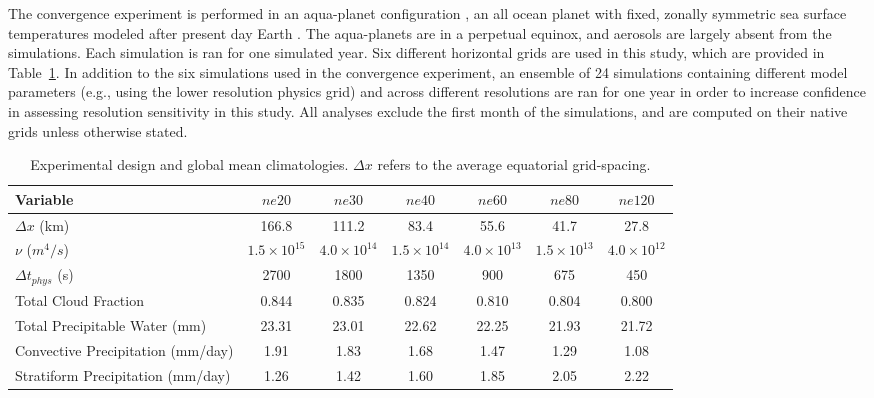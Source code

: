 \documentclass[times]{qjrms4}
\begin{document}
The convergence experiment is performed in an aqua-planet configuration \citep{NH2000ASL,MWO2016JAMES}, an all ocean planet with fixed, zonally symmetric sea surface temperatures modeled after present day Earth \citep[$QOBS$ in][]{NH2000ASL}. The aqua-planets are in a perpetual equinox, and aerosols are largely absent from the simulations. Each simulation is ran for one simulated year. Six different horizontal grids are used in this study, which are provided in Table~\ref{tbl:table1}. In addition to the six simulations used in the convergence experiment, an ensemble of 24 simulations containing different model parameters (e.g., using the lower resolution physics grid) and across different resolutions are ran for one year in order to increase confidence in assessing resolution sensitivity in this study. All analyses exclude the first month of the simulations, and are computed on their native grids unless otherwise stated.

 \begin{table}
 \caption{Experimental design and global mean climatologies. $\Delta x$ refers to the average equatorial grid-spacing.}
 \centering
 \scriptsize
 \begin{tabular}{lcccccc}
   \hline
   Variable & $ne20$ & $ne30$ & $ne40$ & $ne60$ & $ne80$ & $ne120$ \\ 
   \hline
   $\Delta x$ (km) & 166.8 & 111.2 & 83.4 & 55.6 & 41.7 & 27.8 \\
   $\nu$ ($m^4/s$) & $1.5 \times 10^{15}$ & $4.0 \times 10^{14}$ & $1.5 \times 10^{14}$ & $4.0 \times 10^{13}$  & $1.5 \times 10^{13}$ & $4.0 \times 10^{12}$\\
    $\Delta t_{phys}$ (s) & 2700 & 1800 & 1350 & 900 & 675 & 450 \\
   Total Cloud Fraction & 0.844 & 0.835 & 0.824 & 0.810 & 0.804 & 0.800 \\ 
   Total Precipitable Water (mm) & 23.31& 23.01 & 22.62 & 22.25 & 21.93 & 21.72 \\
   Convective Precipitation (mm/day) & 1.91 & 1.83 & 1.68 & 1.47 & 1.29 & 1.08 \\
   Stratiform Precipitation (mm/day) & 1.26 & 1.42 & 1.60 & 1.85 & 2.05 & 2.22 \\      
 \hline
 \end{tabular}
 \label{tbl:table1}
 \end{table}
\end{document}
